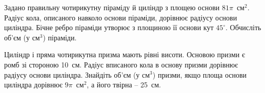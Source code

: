 \documentclass[12pt]{article}
\begin{document}
\begin{samepage}
\noindent\zadnum Задано правильну чотирикутну піраміду й циліндр з площею основи $81\pi$~см$^2$. Радіус кола, описаного навколо основи піраміди, дорівнює радіусу основи циліндра. Бічне ребро піраміди утворює з площиною її основи кут $45^\circ$. Обчисліть об’єм (у см$^3$) піраміди. 

\nmtnobreak
\nopagebreak\nbvspace{0.5cm}
\nmtAnswerBox
\par{}
\end{samepage}

\begin{samepage}
\noindent\zadnum Циліндр і пряма чотирикутна призма мають рівні висоти. Основою призми є ромб зі стороною 10~см. Радіус вписаного кола в основу призми дорівнює радіусу основи циліндра. Знайдіть об’єм (у см$^3$) призми, якщо площа основи циліндра дорівнює $9\pi$~см$^2$, а його твірна – 25~см. 

\nmtnobreak
\nopagebreak\nbvspace{0.5cm}
\nmtAnswerBox
\par{}
\end{samepage}
\end{document}
